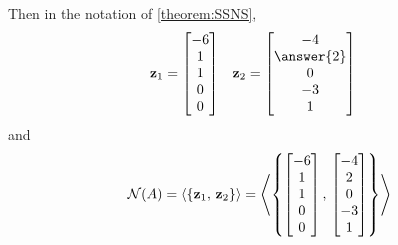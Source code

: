\documentclass{ximera}
\begin{document}
\begin{example}
  Then in the notation of \ref{theorem:SSNS},
  \begin{align*}
    \vect{z}_1&=\colvector{-6\\1\\1\\0\\0}&
    \vect{z}_2&=\colvector{-4\\\answer{2}\\0\\-3\\1}
  \end{align*}
  and
  \[
    \mathcal{N}\!\left(A\right)
    =\left\langle\left\{\mathbf{z}_1,\,\mathbf{z}_2\right\}\right\rangle
    =\left\langle\left\{\begin{bmatrix}-6\\1\\1\\0\\0\end{bmatrix},\,\begin{bmatrix}-4\\2\\0\\-3\\1\end{bmatrix}\right\}\right\rangle
  \]
\end{example}
\end{document}

